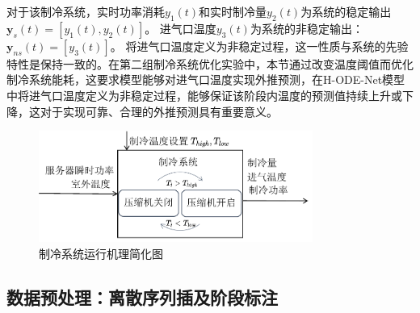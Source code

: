 对于该制冷系统，实时功率消耗$y_1(t)$和实时制冷量$y_2(t)$为系统的稳定输出$\boldsymbol y_s(t)=[y_1(t), y_2(t)]$。
进气口温度$y_3(t)$为系统的非稳定输出：$\boldsymbol y_{ns}(t)=[y_3(t)]$。
将进气口温度定义为非稳定过程，这一性质与系统的先验特性是保持一致的。在第二组制冷系统优化实验中，本节通过改变温度阈值而优化制冷系统能耗，这要求模型能够对进气口温度实现外推预测，在H-ODE-Net模型中将进气口温度定义为非稳定过程，能够保证该阶段内温度的预测值持续上升或下降，这对于实现可靠、合理的外推预测具有重要意义。
\begin{figure}[h]
    \centering
    \includegraphics[width=0.8\textwidth]{figures/chapter4/cooling_workloop.pdf}
  \caption{制冷系统运行机理简化图}
  \label{fig:cooling_workloop} 
\end{figure}


\subsection{数据预处理：离散序列插及阶段标注}

